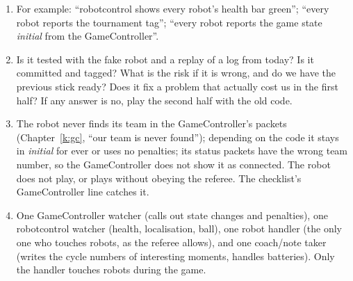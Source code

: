 \begin{enumerate}[label=\textbf{\ansnum.\arabic*}]
  \item For example: ``robotcontrol shows every robot's health bar green''; ``every robot reports the tournament tag''; ``every robot reports the game state \emph{initial} from the GameController''.
  \item Is it tested with the fake robot and a replay of a log from today? Is it committed and tagged? What is the risk if it is wrong, and do we have the previous stick ready? Does it fix a problem that actually cost us in the first half? If any answer is no, play the second half with the old code.
  \item The robot never finds its team in the GameController's packets (Chapter~\ref{k:gc}, ``our team is never found''); depending on the code it stays in \emph{initial} for ever or uses no penalties; its status packets have the wrong team number, so the GameController does not show it as connected. The robot does not play, or plays without obeying the referee. The checklist's GameController line catches it.
  \item One GameController watcher (calls out state changes and penalties), one robotcontrol watcher (health, localisation, ball), one robot handler (the only one who touches robots, as the referee allows), and one coach/note taker (writes the cycle numbers of interesting moments, handles batteries). Only the handler touches robots during the game.
\end{enumerate}
